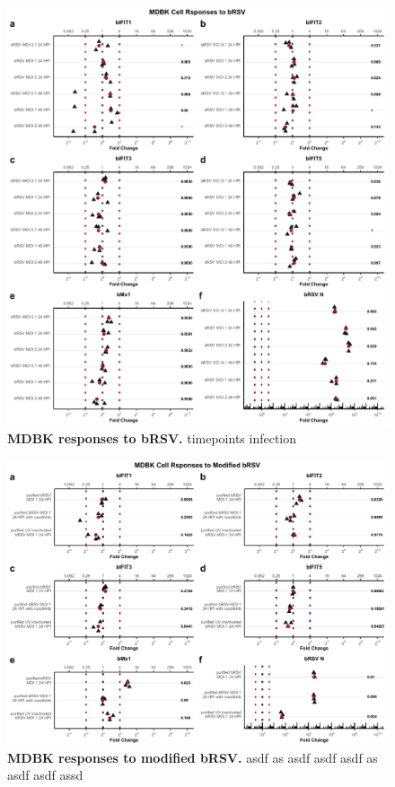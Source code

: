 \begin{figure}
    \centering
    \includegraphics[width=1\linewidth]{07. Chapter 2/Figs/02. Induction/03. mdbk_brsv_timepoints.pdf}
    \caption[MDBK responses to bRSV.]{\textbf{MDBK responses to bRSV.} timepoints infection }
    \label{MDBK responses to bRSV}
\end{figure}

\begin{figure}
    \centering
    \includegraphics[width=1\linewidth]{07. Chapter 2/Figs/02. Induction/04. mdbk_brsv_uv_roxo.pdf}
    \caption[MDBK responses to modified bRSV.]{\textbf{MDBK responses to modified bRSV.} asdf as asdf asdf asdf as asdf asdf assd }
    \label{MDBK responses to modified bRS}
\end{figure}


